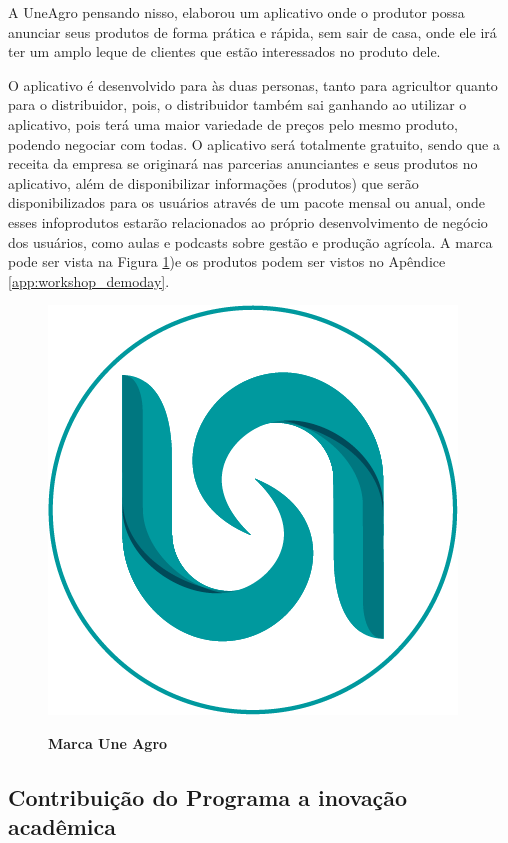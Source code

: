 A UneAgro pensando nisso, elaborou um aplicativo onde o produtor possa anunciar seus produtos de forma prática e rápida, sem sair de casa, onde ele irá ter um amplo leque de clientes que estão interessados no produto dele.

O aplicativo é desenvolvido para às duas personas, tanto para agricultor quanto para o distribuidor, pois, o distribuidor também sai ganhando ao utilizar o aplicativo, pois terá uma maior variedade de preços pelo mesmo produto, podendo negociar com todas. O aplicativo será totalmente gratuito, sendo que a receita da empresa se originará nas parcerias anunciantes e seus produtos no aplicativo, além de disponibilizar informações (produtos) que serão disponibilizados para os usuários através de um pacote mensal ou anual, onde esses infoprodutos estarão relacionados ao próprio desenvolvimento de negócio dos usuários, como aulas e podcasts sobre gestão e produção agrícola. A marca pode ser vista na Figura \ref{figura_28})e os produtos podem ser vistos no Apêndice \ref{app:workshop_demoday}.

\begin{figure}[H]
\centering
\caption{\textbf{Marca Une Agro}}
\includegraphics[scale=0.35]{Imagens/uneagro.png}
\label{figura_28}
\end{figure}




\subsection{Contribuição do Programa a inovação acadêmica}




